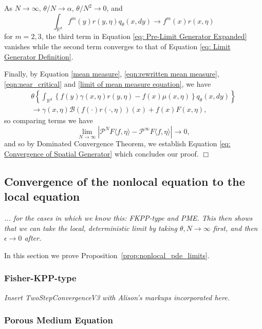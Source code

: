 \documentclass[12pt]{article}
\newenvironment {proof}{{\noindent\bf Proof }}{\hfill $\Box$ \medskip}
\newcommand{\comment}[1]{{\color{blue} \it #1}}
\begin{document}
\begin{proof}
As $N\to \infty$, 
$\theta/N \to \alpha$, 
$\theta/N^2 \to 0$,
and 
$$\int_{\mathbb{R}^d} f^m(y) r(y,\eta) q_{\theta}(x,dy) \to f^m(x)r(x, \eta)$$
for $m=2,3$,
the third term in Equation \eqref{eq: Pre-Limit Generator Expanded} vanishes
while the second term converges to
that of Equation \eqref{eq: Limit Generator Definition}.

Finally, by Equation \eqref{mean measure},
\eqref{eqn:rewritten mean measure}, \eqref{eqn:near_critical} and
\eqref{limit of mean measure equation},
we have 
\begin{multline}
 \theta\left\{\int_{\mathbb{R}^d} \left\{f(y)\gamma(x, \eta) r(y,\eta) -f(x)\mu(x, \eta)\right\}q_{\theta}(x,dy)\right\}
 \\
\to \gamma(x, \eta)                           \mathcal{B}\left(
                            f(\cdot) r(\cdot, \eta)
                            \right)(x)
                    +
                    f(x)
                        F(x, \eta),
\end{multline}
so comparing terms we have
\begin{equation}
\lim_{N\to \infty} |\mathcal{P}^{N}F\langle f, \eta \rangle - \mathcal{P}^{\infty}F\langle f, \eta \rangle| \to 0,   
\end{equation}
and so by Dominated Convergence Theorem,
we establish Equation 
\eqref{eq: Convergence of Spatial Generator}
which concludes our proof.
\end{proof}




\subsection{Convergence of the nonlocal equation to the local equation}

\comment{... for the cases in which we know this: FKPP-type and PME.
This then shows that we can take the local, deterministic limit
by taking $\theta, N \to \infty$ first, and then $\epsilon \to 0$ after.
}

In this section we prove Proposition~\ref{prop:nonlocal_pde_limits}.

\subsubsection{Fisher-KPP-type}

\comment{Insert TwoStepConvergenceV3 with Alison's markups incorporated here.}

\subsubsection{Porous Medium Equation}
\end{document}
